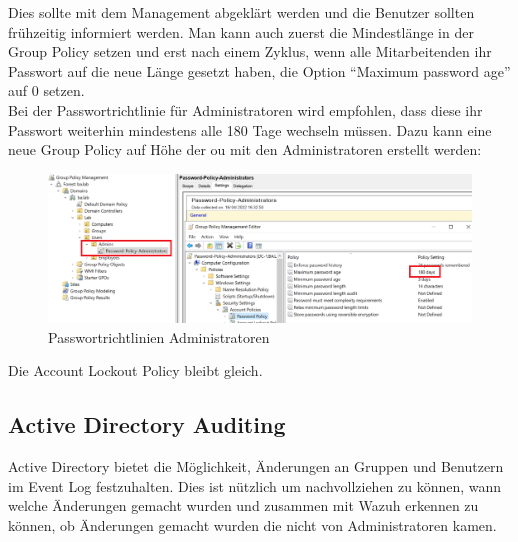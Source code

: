 Dies sollte mit dem Management abgeklärt werden und die Benutzer sollten frühzeitig informiert werden.
Man kann auch zuerst die Mindestlänge in der Group Policy setzen und erst nach einem Zyklus, wenn alle Mitarbeitenden ihr Passwort auf die neue Länge gesetzt haben, die Option ``Maximum password age'' auf 0 setzen. \\

Bei der Passwortrichtlinie für Administratoren wird empfohlen, dass diese ihr Passwort weiterhin mindestens alle 180 Tage wechseln müssen.
Dazu kann eine neue Group Policy auf Höhe der \acrshort{ou} mit den Administratoren erstellt werden:
\begin{figure}[H]
    \centering
    \includegraphics[width=0.7\linewidth]{../img/IAM/admin-password-policy.png}
    \caption{Passwortrichtlinien Administratoren}
\end{figure}
Die Account Lockout Policy bleibt gleich.

\subsection{Active Directory Auditing}
Active Directory bietet die Möglichkeit, Änderungen an Gruppen und Benutzern im Event Log festzuhalten.
Dies ist nützlich um nachvollziehen zu können, wann welche Änderungen gemacht wurden und zusammen mit Wazuh erkennen zu können, ob Änderungen gemacht wurden die nicht von Administratoren kamen.\\

